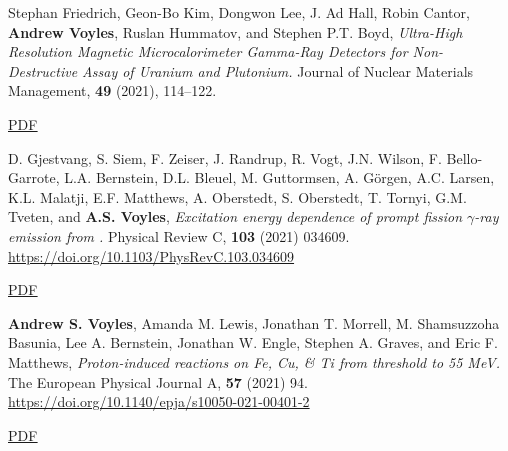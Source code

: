 \begin{bibsection}
\item Stephan Friedrich, Geon-Bo Kim, Dongwon Lee, J. Ad Hall, Robin Cantor, \textbf{Andrew Voyles}, Ruslan Hummatov, and Stephen P.T. Boyd, \emph{Ultra-High Resolution Magnetic Microcalorimeter Gamma-Ray Detectors for Non-Destructive Assay of Uranium and Plutonium.} Journal of Nuclear Materials Management, \textbf{49} (2021), 114--122. 

\ifshort \vspace{0.1cm} \href{https://avoyles.github.io/papers/Friedrich2021_MMC.pdf}{\underline{PDF}} \else  \fi 

\item D. Gjestvang, S. Siem, F. Zeiser, J. Randrup, R. Vogt, J.N. Wilson, F. Bello-Garrote, L.A. Bernstein, D.L. Bleuel, M. Guttormsen, A. Görgen, A.C. Larsen, K.L. Malatji, E.F. Matthews, A. Oberstedt, S. Oberstedt, T. Tornyi, G.M. Tveten, and \textbf{A.S. Voyles}, \emph{Excitation energy dependence of prompt fission $\gamma$-ray emission from  .} Physical Review C, \textbf{103} (2021) 034609. \url{https://doi.org/10.1103/PhysRevC.103.034609} 

\ifshort \vspace{0.1cm} \href{https://avoyles.github.io/papers/Gjestvang2021_241Pu.pdf}{\underline{PDF}} \else  \fi 


\item \textbf{Andrew S. Voyles}, Amanda M. Lewis, Jonathan T. Morrell, M. Shamsuzzoha Basunia, Lee A. Bernstein, Jonathan W. Engle, Stephen A. Graves, and Eric F. Matthews, \emph{Proton-induced reactions on Fe, Cu, \& Ti from threshold to 55 MeV.} The European Physical Journal A, \textbf{57} (2021) 94. \url{https://doi.org/10.1140/epja/s10050-021-00401-2} 

\ifshort \vspace{0.1cm} \href{https://avoyles.github.io/papers/Voyles2021_Fe_px.pdf}{\underline{PDF}} \else  \fi 



\end{bibsection}
